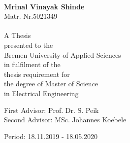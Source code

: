\begin{titlepage}
\begin{singlespace}
\begin{center}
\begin{spacing}{2}
{\Huge\scshape \Was}\\
\end{spacing}
\end{center}
\end{singlespace}
\vspace*{-0.3cm}
\noindent \begin{center}
\textbf{\large Mrinal Vinayak Shinde}\\
Matr. Nr.5021349\foreignlanguage{english}{}\\
\vspace*{1cm}
\foreignlanguage{english}{~~~}\\
\foreignlanguage{english}{A Thesis}\\
\foreignlanguage{english}{presented to the }\\
\foreignlanguage{english}{Bremen University of Applied Sciences}\\
\foreignlanguage{english}{in fulfilment of the }\\
\foreignlanguage{english}{thesis requirement for }\\
\foreignlanguage{english}{the degree of Master of Science}\\
\foreignlanguage{english}{in Electrical Engineering}
\par\end{center}

\vfill{}
\vspace*{1cm}
\noindent \begin{center}
First Advisor: Prof. Dr. S. Peik\\
Second Advisor:      MSc. Johannes Koebele
\par\end{center}


\noindent \begin{center}
{\small Period: 18.11.2019 - 18.05.2020}
\par\end{center}{\small \par}

\end{titlepage}





